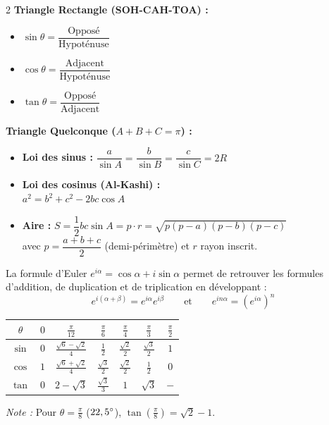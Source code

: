 {\begin{multicols}{2}
\vspace{2pt}
\noindent\textbf{Triangle Rectangle (SOH-CAH-TOA) :}
\begin{itemize}[leftmargin=1.2em, itemsep=1.5pt, topsep=2pt]
    \item $\sin\theta = \dfrac{\text{Opposé}}{\text{Hypoténuse}}$
    \item $\cos\theta = \dfrac{\text{Adjacent}}{\text{Hypoténuse}}$
    \item $\tan\theta = \dfrac{\text{Opposé}}{\text{Adjacent}}$
\end{itemize}

\vspace{2pt}
\noindent\textbf{Triangle Quelconque ($A+B+C = \pi$) :}
\begin{itemize}[leftmargin=1.2em, itemsep=2pt, topsep=2pt]
    \item \textbf{Loi des sinus :} $\dfrac{a}{\sin A} = \dfrac{b}{\sin B} = \dfrac{c}{\sin C} = 2R$
    \item \textbf{Loi des cosinus (Al-Kashi) :}\\
    $a^2 = b^2 + c^2 - 2bc\cos A$
    \item \textbf{Aire :} $S = \dfrac{1}{2}bc\sin A = p\cdot r = \sqrt{p(p-a)(p-b)(p-c)}$\\
    avec $p = \dfrac{a+b+c}{2}$ (demi-périmètre) et $r$ rayon inscrit.
\end{itemize}

\vspace{4pt}
La formule d'Euler $e^{i\alpha} = \cos\alpha + i\sin\alpha$ permet de retrouver les formules d'addition, de duplication et de triplication en développant :
\[
    e^{i(\alpha+\beta)} = e^{i\alpha}e^{i\beta} \qquad \text{et} \qquad e^{in\alpha} = (e^{i\alpha})^n
\]

\vspace{2pt}
\begin{center}
\vspace{-2pt}
\renewcommand{\arraystretch}{1.45}
\setlength{\tabcolsep}{4.5pt}
\begin{tabular}{|c|c|c|c|c|c|c|}
\hline
$\theta$ & $0$ & $\frac{\pi}{12}$ & $\frac{\pi}{6}$ & $\frac{\pi}{4}$ & $\frac{\pi}{3}$ & $\frac{\pi}{2}$ \\ \hline
$\sin$ & $0$ & $\frac{\sqrt{6}-\sqrt{2}}{4}$ & $\frac{1}{2}$ & $\frac{\sqrt{2}}{2}$ & $\frac{\sqrt{3}}{2}$ & $1$ \\ \hline
$\cos$ & $1$ & $\frac{\sqrt{6}+\sqrt{2}}{4}$ & $\frac{\sqrt{3}}{2}$ & $\frac{\sqrt{2}}{2}$ & $\frac{1}{2}$ & $0$ \\ \hline
$\tan$ & $0$ & $2-\sqrt{3}$ & $\frac{\sqrt{3}}{3}$ & $1$ & $\sqrt{3}$ & $-$ \\ \hline
\end{tabular}
\end{center}
\vspace{-2pt}
\noindent\emph{Note :} Pour $\theta = \frac{\pi}{8}$ ($22,5\degree$), $\tan\left(\frac{\pi}{8}\right) = \sqrt{2}-1$.

\end{multicols}
}


